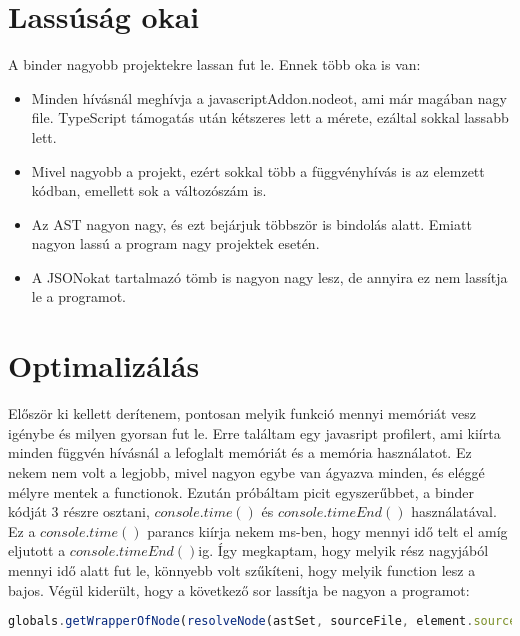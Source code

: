 \section{Lassúság okai}

A binder nagyobb projektekre lassan fut le. Ennek több oka is van:

\begin{itemize}
      \item Minden hívásnál meghívja a javascriptAddon.nodeot, ami már magában nagy file. TypeScript támogatás után kétszeres lett a mérete, ezáltal sokkal lassabb lett.
      \item Mivel nagyobb a projekt, ezért sokkal több a függvényhívás is az elemzett kódban, emellett sok a változószám is.
      \item Az AST nagyon nagy, és ezt bejárjuk többször is bindolás alatt. Emiatt nagyon lassú a program nagy projektek esetén.
      \item A JSONokat tartalmazó tömb is nagyon nagy lesz, de annyira ez nem lassítja le a programot.
\end{itemize}

\section{Optimalizálás}

\noindent

Először ki kellett derítenem, pontosan melyik funkció mennyi memóriát vesz igénybe és milyen gyorsan fut le.
Erre találtam egy javasript profilert, ami kiírta minden függvén hívásnál a lefoglalt memóriát és a memória használatot.
Ez nekem nem volt a legjobb, mivel nagyon egybe van ágyazva minden, és eléggé mélyre mentek a functionok.
Ezután próbáltam picit egyszerűbbet, a binder kódját 3 részre osztani, ${console.time()}$ és ${console.timeEnd()}$ használatával.
Ez a ${console.time()}$ parancs kiírja nekem ms-ben, hogy mennyi idő telt el amíg eljutott a ${console.timeEnd()}$ig.
Így megkaptam, hogy melyik rész nagyjából mennyi idő alatt fut le, könnyebb volt szűkíteni, hogy melyik function lesz a bajos.
Végül kiderült, hogy a következő sor lassítja be nagyon a programot:

\begin{lstlisting}[caption={Problémás function}, label={lst:binder_problemas_function}, language={JavaScript}]
globals.getWrapperOfNode(resolveNode(astSet, sourceFile, element.source.range.start, element.source.range.end, true));
\end{lstlisting}

